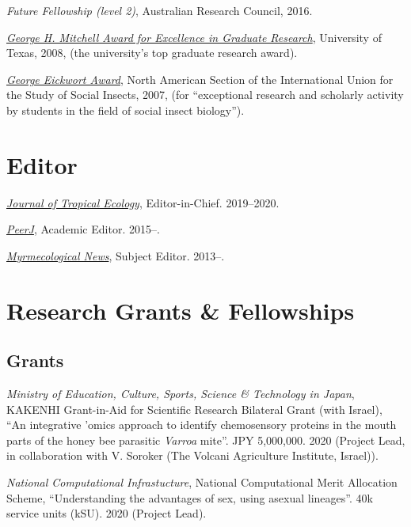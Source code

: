 \documentclass[11pt]{article}
\def\printdate#1{\xprintdate#1-}
\def\xprintdate#1-#2-#3-{#1}
\def\daterange#1#2{\xprintdate#1---\xprintdate#2-}
\begin{document}
\ind \textit{Future Fellowship (level 2)}, Australian Research
Council, 2016.

\ind \textit{\href{https://news.utexas.edu/2008/05/29/graduate-students-honored-for-excellence}{George
H. Mitchell Award for Excellence in Graduate Research}}, University of
Texas, 2008, (the university's top graduate research award).

\ind \textit{\href{http://iussi.cyberbee.net/wp-content/uploads/2010/04/2007\_Fall\_NAS-IUSSI\_Newsletter.pdf}{George
Eickwort Award}}, North American Section of the International Union for
the Study of Social Insects, 2007, (for ``exceptional research and
scholarly activity by students in the field of social insect biology'').


\section{Editor}

\ind \textit{\href{https://mc.manuscriptcentral.com/jte}{Journal of
Tropical Ecology}}, Editor-in-Chief. \daterange{2019-00-00}{2020-00-00}.

\ind \textit{\href{https://peerj.com/sasha/}{PeerJ}}, Academic
Editor. \printdate{2015-00-00}--.

\ind \textit{\href{http://openlogicproject.org/}{Myrmecological
News}}, Subject Editor. \printdate{2013-00-00}--.


\section{Research Grants \& Fellowships}

\subsection{Grants}

\ind \textit{Ministry of Education, Culture, Sports, Science \&
Technology in Japan}, KAKENHI Grant-in-Aid for Scientific Research
Bilateral Grant (with Israel), ``An integrative 'omics approach to
identify chemosensory proteins in the mouth parts of the honey bee
parasitic \textit{Varroa} mite''.  JPY 5,000,000. 2020 (Project Lead, in
collaboration with V. Soroker (The Volcani Agriculture Institute,
Israel)).


\ind \textit{National Computational Infrastucture}, National
Computational Merit Allocation Scheme, ``Understanding the advantages of
sex, using asexual lineages''.  40k service units (kSU). 2020 (Project
Lead).
\end{document}
